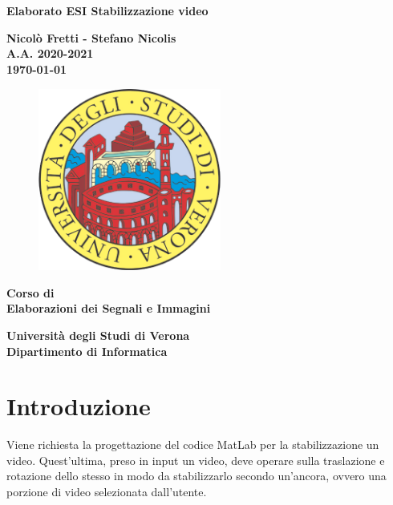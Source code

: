\documentclass[12pt]{article}
\begin{document}
\begin{titlepage}
   \begin{center}
       \vspace*{1cm}
 
	\large
      {\huge \textbf{Elaborato ESI Stabilizzazione video} }
 
       \vspace{1.5cm}
 
       \textbf{Nicolò Fretti - Stefano Nicolis}\\
	\textbf{A.A. 2020-2021}\\
	\vspace{0.35cm}
	\textbf{\today}

\vfill
\begin{figure}[h!]
	\begin{center}
	  \includegraphics[height=6cm, width=6cm]{media/logounivr}
	\end{center}
\end{figure}
 
	\vfill
 	\textbf{Corso di \\
       Elaborazioni dei Segnali e Immagini\\}
 
       \vspace{3cm}
 
      \begin{multicols}{2}
      \textbf{Università degli Studi di Verona\\
	 Dipartimento di Informatica}
	\end{multicols}
 
   \end{center}
\end{titlepage}


\tableofcontents

\clearpage

\section{Introduzione}
Viene richiesta la progettazione del codice MatLab per la stabilizzazione un video. Quest'ultima, preso in input un video, deve operare sulla traslazione e rotazione dello stesso in modo da stabilizzarlo secondo un'ancora, ovvero una porzione di video selezionata dall'utente.
\end{document}
